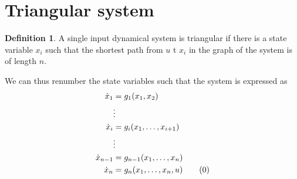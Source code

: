 \documentclass[12pt, openany]{report}
\theoremstyle{definition}
\newtheorem{definition}[thm]{Definition}
\begin{document}
\section{Triangular system}
\begin{definition}
    A single input dynamical system is triangular if there is a state variable \(x_i\) such that the shortest path from \(u\) t \(x_i\) in the graph of the system is of length \(n\).
\end{definition}
We can thus renumber the state variables such that the system is expressed as
\begin{align}\label{eq:triangular}
    \dot x_1 &= g_1(x_1,x_2) \nonumber\\
    &\vdots\nonumber\\
    \dot x_i &= g_i(x_1,\dots, x_{i+1})\nonumber\\
    & \vdots\nonumber\\
    \dot x_{n-1} &= g_{n-1}(x_1,\dots, x_n)\nonumber\\
    \dot x_n &= g_n(x_1,\dots,x_n,u)\tag{\theequation}  \refstepcounter{equation}
\end{align}
\end{document}
